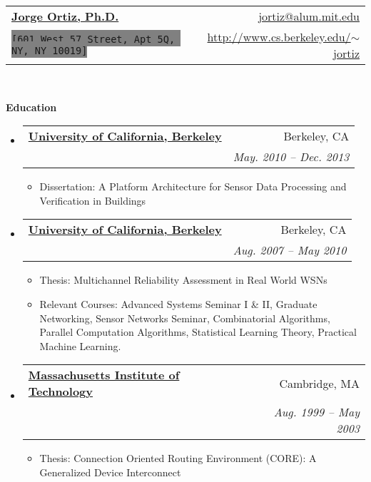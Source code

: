 \documentclass[letterpaper,11pt]{article}
\makeatletter
\newcommand{\resitem}[1]{\item #1 \vspace{-2pt}}
\newcommand{\resheading}[1]{{\large \colorbox{mygrey}{\begin{minipage}{\textwidth}{\textbf{#1 \vphantom{p\^{E}}}}\end{minipage}}}}
\newcommand{\ressubheading}[4]{
\begin{tabular*}{6.5in}{l@{\extracolsep{\fill}}r}
		\textbf{#1} & #2 \\
		\textit{#3} & \textit{#4} \\
\end{tabular*}\vspace{-6pt}}
\makeatother
\begin{document}
\newcommand{\mywebheader}{
\begin{tabular*}{7in}{l@{\extracolsep{\fill}}r}
	\textbf{\href{http://researcher.ibm.com/researcher/view.php?person=us-jjortiz}{\LARGE Jorge Ortiz, Ph.D.}} & \href{mailto:jortiz@alum.mit.edu}{jortiz@alum.mit.edu}\\
	{\footnotesize \texttt{\colorbox{gray}{[601 West 57 Street, Apt 5Q, NY, NY 10019]}}} & \href{http://www.cs.berkeley.edu/~jortiz}{http://www.cs.berkeley.edu/$\sim$jortiz} \\
	\end{tabular*}
\\
\vspace{0.1in}}

\mywebheader

\resheading{Education}
	\begin{itemize}
        \item
            \ressubheading{\href{}{University of California, Berkeley}}{Berkeley, CA}{\href{}{Doctor of Philosophy in Computer Science}; \href{}}{May. 2010 -- Dec. 2013}
                { \footnotesize
				\begin{itemize}
					\resitem{Dissertation: A Platform Architecture for Sensor Data Processing and Verification in Buildings}
				\end{itemize}
				}
        \item
            \ressubheading{\href{}{University of California, Berkeley}}{Berkeley, CA}{\href{}{Masters of Science in Computer Science}; \href{}}{Aug. 2007 -- May 2010}
                { \footnotesize
				\begin{itemize}
					\resitem{Thesis: Multichannel Reliability Assessment in Real World WSNs}
                    \resitem{Relevant Courses: Advanced Systems Seminar I \& II, Graduate Networking, Sensor Networks Seminar, Combinatorial Algorithms, Parallel Computation Algorithms, Statistical Learning Theory, Practical Machine Learning.}
				\end{itemize}
				}
       \item
            \ressubheading{\href{}{Massachusetts Institute of Technology}}{Cambridge, MA}{\href{}{Bachelors of Science in Computer Science and Engineering}; \href{}}{Aug. 1999 -- May 2003}
                { \footnotesize
				\begin{itemize}
					\resitem{Thesis: Connection Oriented Routing Environment (CORE): A Generalized Device         Interconnect}
				\end{itemize}
				}
    \end{itemize} %
\end{document}
